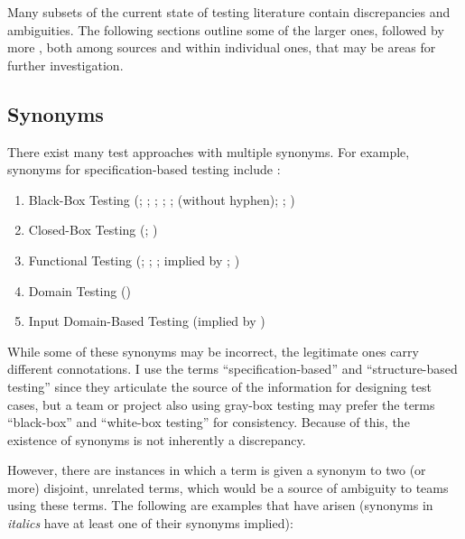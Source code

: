 Many subsets of the current state of testing literature contain discrepancies
and ambiguities. The following sections outline some of the larger ones,
followed by more , both among sources and within
individual ones, that may be areas for further investigation.

\subsection{Synonyms}
There exist many test approaches with multiple synonyms. For example, synonyms
for specification-based testing include :
\begin{enumerate}
      \item Black-Box Testing (\citealp[p.~9]{IEEE2022}; \citeyear[p.~8]{IEEE2021};
            \citeyear[p.~431]{IEEE2017}; \citealp[p.~5-10]{SWEBOK2024};
            \citealpISTQB{}; \citealp[p.~46]{Firesmith2015} (without hyphen);
            \citealp[p.~344]{SakamotoEtAl2013}; \citealp[p.~399]{vanVliet2000})
      \item Closed-Box Testing (\citealp[p.~9]{IEEE2022}; \citeyear[p.~431]{IEEE2017})
      \item Functional Testing (\citeyear[p.~196]{IEEE2017}; \citealp[p.~44]{Kam2008};
            \citealp[p.~399]{vanVliet2000}; implied by \citeyear[p.~129]{IEEE2021};
            \citeyear[p.~431]{IEEE2017})
      \item Domain Testing (\citealp[p.~5-10]{SWEBOK2024})
      \item Input Domain-Based Testing (implied by \citealp[p.~4-8]{SWEBOK2014})
\end{enumerate}

While some of these synonyms may be incorrect, the legitimate ones carry
different connotations. I use the terms ``specification-based'' and
``structure-based testing'' since they articulate the source of the information
for designing test cases, but a team or project also using gray-box testing may
prefer the terms ``black-box'' and ``white-box testing'' for consistency.
Because of this, the existence of synonyms is not inherently a discrepancy.

However, there are instances in which a term is given a synonym to two (or more)
disjoint, unrelated terms, which would be a source of ambiguity to teams using
these terms. The following are examples that have arisen (synonyms in
\emph{italics} have at least one of their synonyms implied):

\begin{enumerate}
      
\end{enumerate}

